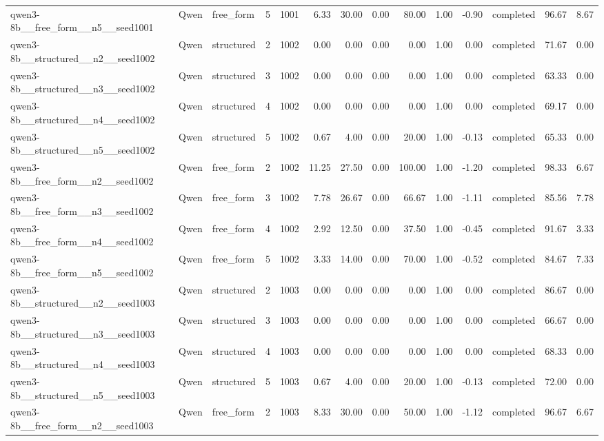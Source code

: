 \begin{longtable}{lllrrrrrrrrlrr}
qwen3-8b\_\_free\_form\_\_n5\_\_seed1001 & Qwen & free\_form & 5 & 1001 & 6.33 & 30.00 & 0.00 & 80.00 & 1.00 & -0.90 & completed & 96.67 & 8.67 \\
qwen3-8b\_\_structured\_\_n2\_\_seed1002 & Qwen & structured & 2 & 1002 & 0.00 & 0.00 & 0.00 & 0.00 & 1.00 & 0.00 & completed & 71.67 & 0.00 \\
qwen3-8b\_\_structured\_\_n3\_\_seed1002 & Qwen & structured & 3 & 1002 & 0.00 & 0.00 & 0.00 & 0.00 & 1.00 & 0.00 & completed & 63.33 & 0.00 \\
qwen3-8b\_\_structured\_\_n4\_\_seed1002 & Qwen & structured & 4 & 1002 & 0.00 & 0.00 & 0.00 & 0.00 & 1.00 & 0.00 & completed & 69.17 & 0.00 \\
qwen3-8b\_\_structured\_\_n5\_\_seed1002 & Qwen & structured & 5 & 1002 & 0.67 & 4.00 & 0.00 & 20.00 & 1.00 & -0.13 & completed & 65.33 & 0.00 \\
qwen3-8b\_\_free\_form\_\_n2\_\_seed1002 & Qwen & free\_form & 2 & 1002 & 11.25 & 27.50 & 0.00 & 100.00 & 1.00 & -1.20 & completed & 98.33 & 6.67 \\
qwen3-8b\_\_free\_form\_\_n3\_\_seed1002 & Qwen & free\_form & 3 & 1002 & 7.78 & 26.67 & 0.00 & 66.67 & 1.00 & -1.11 & completed & 85.56 & 7.78 \\
qwen3-8b\_\_free\_form\_\_n4\_\_seed1002 & Qwen & free\_form & 4 & 1002 & 2.92 & 12.50 & 0.00 & 37.50 & 1.00 & -0.45 & completed & 91.67 & 3.33 \\
qwen3-8b\_\_free\_form\_\_n5\_\_seed1002 & Qwen & free\_form & 5 & 1002 & 3.33 & 14.00 & 0.00 & 70.00 & 1.00 & -0.52 & completed & 84.67 & 7.33 \\
qwen3-8b\_\_structured\_\_n2\_\_seed1003 & Qwen & structured & 2 & 1003 & 0.00 & 0.00 & 0.00 & 0.00 & 1.00 & 0.00 & completed & 86.67 & 0.00 \\
qwen3-8b\_\_structured\_\_n3\_\_seed1003 & Qwen & structured & 3 & 1003 & 0.00 & 0.00 & 0.00 & 0.00 & 1.00 & 0.00 & completed & 66.67 & 0.00 \\
qwen3-8b\_\_structured\_\_n4\_\_seed1003 & Qwen & structured & 4 & 1003 & 0.00 & 0.00 & 0.00 & 0.00 & 1.00 & 0.00 & completed & 68.33 & 0.00 \\
qwen3-8b\_\_structured\_\_n5\_\_seed1003 & Qwen & structured & 5 & 1003 & 0.67 & 4.00 & 0.00 & 20.00 & 1.00 & -0.13 & completed & 72.00 & 0.00 \\
qwen3-8b\_\_free\_form\_\_n2\_\_seed1003 & Qwen & free\_form & 2 & 1003 & 8.33 & 30.00 & 0.00 & 50.00 & 1.00 & -1.12 & completed & 96.67 & 6.67 \\

\end{longtable}
